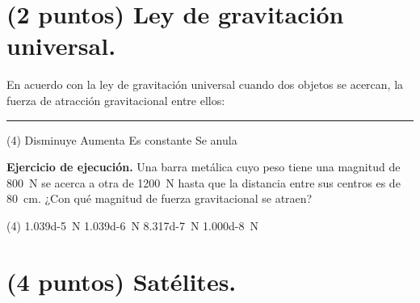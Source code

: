 \documentclass[12pt, letter]{exam}
\begin{document}
\begin{questions}
    \section{(2 puntos) Ley de gravitación universal.}

    \question En acuerdo con la ley de gravitación universal cuando dos objetos se acercan, la fuerza de atracción gravitacional entre ellos: \rule{2cm}{0.1mm}
    \begin{tasks}(4)
        \task Disminuye
        \task Aumenta
        \task Es constante
        \task Se anula
    \end{tasks}
    \question \label{Ejercicio_11} \textbf{Ejercicio de ejecución. } Una barra metálica cuyo peso tiene una magnitud de \SI{800}{\newton} se acerca a otra de \SI{1200}{\newton} hasta que la distancia entre sus centros es de \SI{80}{\centi\meter}. ¿Con qué magnitud de fuerza gravitacional se atraen?
    \begin{tasks}(4)
        \task \SI{1.039d-5}{\newton}
        \task \SI{1.039d-6}{\newton}
        \task \SI{8.317d-7}{\newton}
        \task \SI{1.000d-8}{\newton}
    \end{tasks}

    \newpage

    \section{(4 puntos) Satélites.}


\end{questions}
\end{document}

